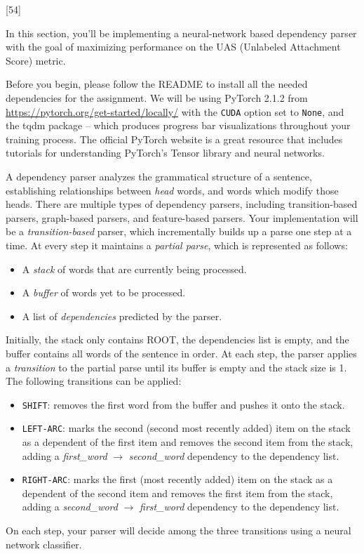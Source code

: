 [54]

In this section, you'll be implementing a neural-network based dependency parser with the goal of maximizing performance on the UAS (Unlabeled Attachment Score) metric.\newline

Before you begin, please follow the README to install all the needed dependencies for the assignment. We will be using PyTorch 2.1.2 from \url{https://pytorch.org/get-started/locally/} with the \texttt{CUDA} option set to \texttt{None}, and the tqdm package -- which produces progress bar visualizations throughout your training process. The official PyTorch website is a great resource that includes tutorials for understanding PyTorch's Tensor library and neural networks. \newline

A dependency parser analyzes the grammatical structure of a sentence, establishing relationships between \textit{head} words, and words which modify those heads. There are multiple types of dependency parsers, including transition-based parsers, graph-based parsers, and feature-based parsers. Your implementation will be a {\it transition-based} parser, which incrementally builds up a parse one step at a time. At every step it maintains a \textit{partial parse}, which is represented as follows:
\begin{itemize}
\item A {\it stack} of words that are currently being processed.
\item A {\it buffer} of words yet to be processed.
\item A list of {\it dependencies} predicted by the parser.
\end{itemize}
Initially, the stack only contains ROOT, the dependencies list is empty, and the buffer contains all words of the sentence in order. At each step, the parser applies a {\it transition} to the partial parse until its buffer is empty and the stack size is 1. The following transitions can be applied:
\begin{itemize}
\item \texttt{SHIFT}: removes the first word from the buffer and pushes it onto the stack.
\item \texttt{LEFT-ARC}: marks the second (second most recently added) item on the stack as a dependent of the first item and removes the second item from the stack, adding a \textit{first\_word} $\rightarrow$ \textit{second\_word} dependency to the dependency list.
\item \texttt{RIGHT-ARC}: marks the first (most recently added) item on the stack as a dependent of the second item and removes the first item from the stack, adding a \textit{second\_word} $\rightarrow$ \textit{first\_word} dependency to the dependency list.
\end{itemize}
On each step, your parser will decide among the three transitions using a neural network classifier.

